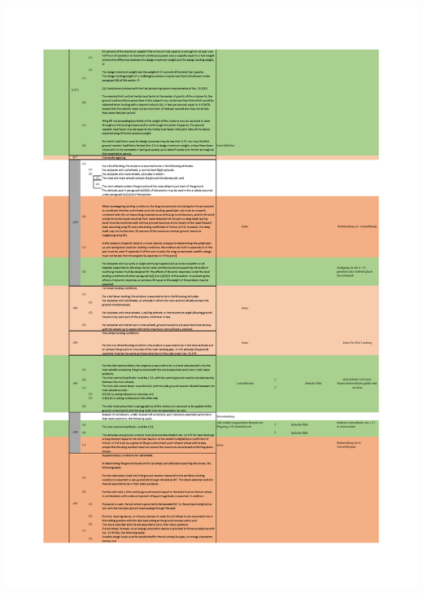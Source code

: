 \begin{table}[H]
\centering
\includegraphics[width=1.0\textwidth, trim={19mm 19mm 19mm 19mm}, clip]{bilder/Tabellen/MPP_Konstruktion_7.pdf}
\end{table}

